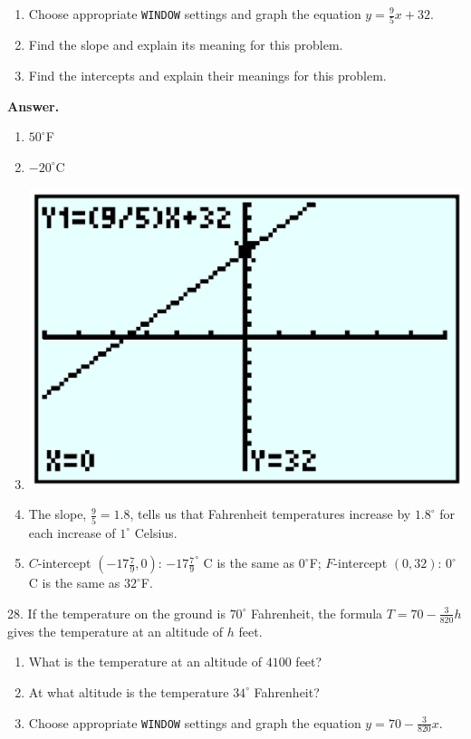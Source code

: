 \documentclass[10pt,]{book}
\theoremstyle{plain}
\theoremstyle{definition}
\theoremstyle{definition}
\theoremstyle{definition}
\theoremstyle{definition}
\numberwithin{equation}{part}
\newcommand\degree[0]{^{\circ}}
\begin{document}
\begin{exerciselist}
\begin{enumerate}[label=*\alph**]
\item\hypertarget{li-1178}{}Choose appropriate \lstinline?WINDOW? settings and graph the equation \(y = \frac{9}{5}x + 32\).%
\item\hypertarget{li-1179}{}Find the slope and explain its meaning for this problem.%
\item\hypertarget{li-1180}{}Find the intercepts and explain their meanings for this problem.%
\end{enumerate}
%
\par\smallskip
\par\smallskip
\noindent\textbf{Answer.}\hypertarget{answer-177}{}\quad
\leavevmode%
\begin{enumerate}[label=*\alph**]
\item\hypertarget{li-1181}{}\(50\degree\)F%
\item\hypertarget{li-1182}{}\(-20\degree\)C%
\item\hypertarget{li-1183}{}\includegraphics[width=0.4\linewidth]{images/fig-ans-1-5-27.jpg}
%
\item\hypertarget{li-1184}{}The slope, \(\frac{9}{5} = 1.8\), tells us that Fahrenheit temperatures increase by \(1.8\degree\) for each increase of \(1\degree\) Celsius.%
\item\hypertarget{li-1185}{}\(C\)-intercept \(\left(-17\frac{7}{9}, 0\right)\): \(-17\frac{7}{9}\degree\) C is the same as \(0\degree\)F; \(F\)-intercept \((0, 32)\): \(0\degree\)C is the same as \(32\degree\)F.%
\end{enumerate}
%
\item[28.]\hypertarget{exercise-314}{}If the temperature on the ground is \(70\degree\) Fahrenheit, the formula \(T = 70 - \frac{3}{820}h\) gives the temperature at an altitude of \(h\) feet. \leavevmode%
\begin{enumerate}[label=*\alph**]
\item\hypertarget{li-1186}{}What is the temperature at an altitude of \(4100\) feet?%
\item\hypertarget{li-1187}{}At what altitude is the temperature \(34\degree\) Fahrenheit?%
\item\hypertarget{li-1188}{}Choose appropriate \lstinline?WINDOW? settings and graph the equation \(y = 70- \frac{3}{820}x\).%

\end{enumerate}
\end{exerciselist}
\end{document}
